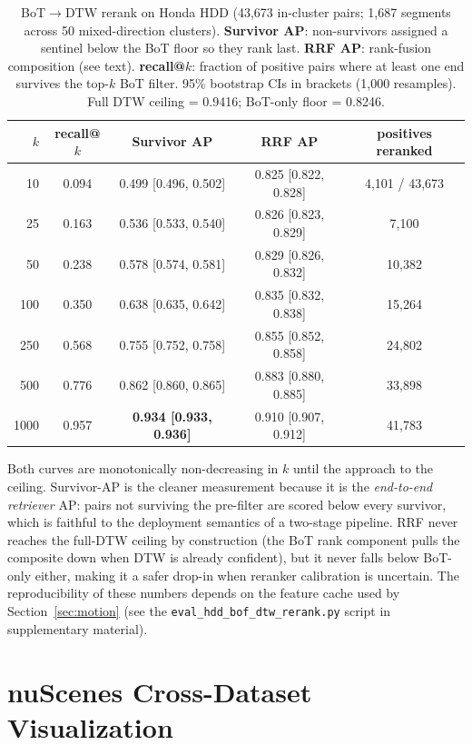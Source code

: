 \documentclass{article}
\theoremstyle{remark}
\begin{document}
\begin{table}[h]
\centering
\caption{BoT$\to$DTW rerank on Honda HDD (43{,}673 in-cluster pairs; 1{,}687 segments across 50 mixed-direction clusters). \textbf{Survivor AP}: non-survivors assigned a sentinel below the BoT floor so they rank last. \textbf{RRF AP}: rank-fusion composition (see text). \textbf{recall@$k$}: fraction of positive pairs where at least one end survives the top-$k$ BoT filter. 95\% bootstrap CIs in brackets (1{,}000 resamples). Full DTW ceiling = 0.9416; BoT-only floor = 0.8246.}
\label{tab:rerank_full}
\begin{tabular}{rcccc}
\toprule
$k$ & recall@$k$ & Survivor AP & RRF AP & positives reranked \\
\midrule
10 & 0.094 & 0.499 [0.496, 0.502] & 0.825 [0.822, 0.828] & 4{,}101 / 43{,}673 \\
25 & 0.163 & 0.536 [0.533, 0.540] & 0.826 [0.823, 0.829] & 7{,}100 \\
50 & 0.238 & 0.578 [0.574, 0.581] & 0.829 [0.826, 0.832] & 10{,}382 \\
100 & 0.350 & 0.638 [0.635, 0.642] & 0.835 [0.832, 0.838] & 15{,}264 \\
250 & 0.568 & 0.755 [0.752, 0.758] & 0.855 [0.852, 0.858] & 24{,}802 \\
500 & 0.776 & 0.862 [0.860, 0.865] & 0.883 [0.880, 0.885] & 33{,}898 \\
1000 & 0.957 & \textbf{0.934 [0.933, 0.936]} & 0.910 [0.907, 0.912] & 41{,}783 \\
\bottomrule
\end{tabular}
\end{table}

Both curves are monotonically non-decreasing in $k$ until the approach to the ceiling. Survivor-AP is the cleaner measurement because it is the \emph{end-to-end retriever} AP: pairs not surviving the pre-filter are scored below every survivor, which is faithful to the deployment semantics of a two-stage pipeline. RRF never reaches the full-DTW ceiling by construction (the BoT rank component pulls the composite down when DTW is already confident), but it never falls below BoT-only either, making it a safer drop-in when reranker calibration is uncertain. The reproducibility of these numbers depends on the feature cache used by Section~\ref{sec:motion} (see the \texttt{eval\_hdd\_bof\_dtw\_rerank.py} script in supplementary material).

\section{nuScenes Cross-Dataset Visualization}
\label{sec:nuscenes_figure}
\end{document}
